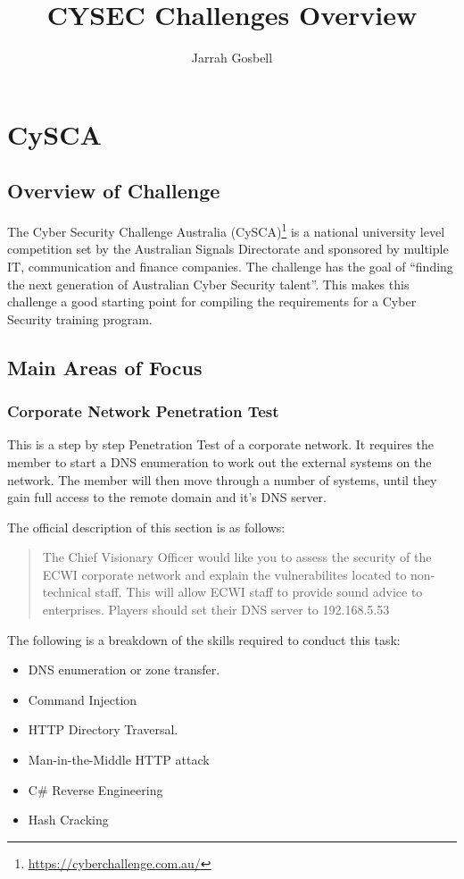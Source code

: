\documentclass[a4paper,11pt]{report}
\author{Jarrah Gosbell}
\title{CYSEC Challenges Overview}
\begin{document}
\maketitle
\tableofcontents
\chapter{CySCA}
	\section{Overview of Challenge}
		The Cyber Security Challenge Australia (CySCA)\footnote{\url{https://cyberchallenge.com.au/}} is a national university level competition set by the Australian Signals Directorate 
		and sponsored by multiple IT, communication and finance companies. 
		The challenge has the goal of ``finding the next generation of Australian Cyber Security talent''.
		This makes this challenge a good starting point for compiling the requirements for a Cyber Security training program. 
	\section{Main Areas of Focus}
		\subsection{Corporate Network Penetration Test}
			This is a step by step Penetration Test of a corporate network. 
			It requires the member to start a DNS enumeration to work out the external systems on the network. 
			The member will then move through a number of systems, 
			until they gain full access to the remote domain and it's DNS server. 

			The official description of this section is as follows:
			\begin{quote}
				The Chief Visionary Officer would like you to assess the security of the ECWI corporate network and explain the vulnerabilites located to non-technical staff. This will allow ECWI staff to provide sound advice to enterprises. Players should set their DNS server to 192.168.5.53
			\end{quote}

			The following is a breakdown of the skills required to conduct this task:
			\begin{itemize}
				\item DNS enumeration or zone transfer. 
				\item Command Injection
				\item HTTP Directory Traversal. 
				\item Man-in-the-Middle HTTP attack
				\item C\# Reverse Engineering
				\item Hash Cracking
			\end{itemize}
\end{document}
